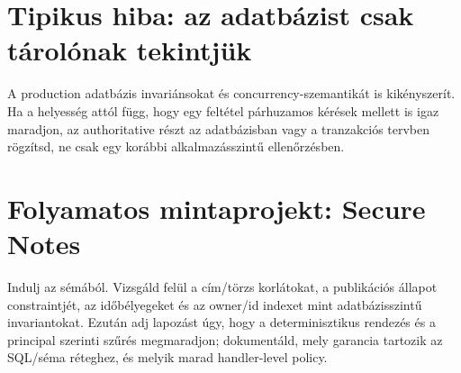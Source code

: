 \section{Tipikus hiba: az adatbázist csak tárolónak tekintjük}
A production adatbázis invariánsokat és concurrency-szemantikát is kikényszerít. Ha a helyesség attól függ, hogy egy feltétel párhuzamos kérések mellett is igaz maradjon, az authoritative részt az adatbázisban vagy a tranzakciós tervben rögzítsd, ne csak egy korábbi alkalmazásszintű ellenőrzésben.

\section{Folyamatos mintaprojekt: Secure Notes}
Indulj az  sémából. Vizsgáld felül a cím/törzs korlátokat, a publikációs állapot constraintjét, az időbélyegeket és az owner/id indexet mint adatbázisszintű invariantokat. Ezután adj lapozást úgy, hogy a determinisztikus rendezés és a principal szerinti szűrés megmaradjon; dokumentáld, mely garancia tartozik az SQL/séma réteghez, és melyik marad handler-level policy.
